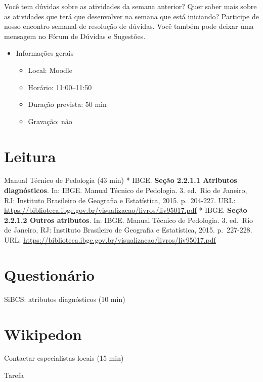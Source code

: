 \documentclass[
  11pt,
  a4paper,
  dvipsnames]{tufte-book}
\providecommand{\tightlist}{%
  \setlength{\itemsep}{0pt}\setlength{\parskip}{0pt}}
\begin{document}
Você tem dúvidas sobre as atividades da semana anterior? Quer saber mais sobre as atividades que terá que desenvolver na semana que está iniciando? Participe de nosso encontro semanal de resolução de dúvidas. Você também pode deixar uma mensagem no Fórum de Dúvidas e Sugestões.

\begin{itemize}
\tightlist
\item
  Informações gerais

  \begin{itemize}
  \tightlist
  \item
    Local: Moodle
  \item
    Horário: 11:00--11:50
  \item
    Duração prevista: 50 min
  \item
    Gravação: não
  \end{itemize}
\end{itemize}

\hypertarget{leitura-3}{%
\section{Leitura}\label{leitura-3}}

Manual Técnico de Pedologia (43 min)
* IBGE. \textbf{Seção 2.2.1.1 Atributos diagnósticos}. In: IBGE. Manual Técnico de Pedologia. 3. ed.~Rio de Janeiro, RJ: Instituto Brasileiro de Geografia e Estatística, 2015. p.~204-227. URL: \url{https://biblioteca.ibge.gov.br/visualizacao/livros/liv95017.pdf}
* IBGE. \textbf{Seção 2.2.1.2 Outros atributos}. In: IBGE. Manual Técnico de Pedologia. 3. ed.~Rio de Janeiro, RJ: Instituto Brasileiro de Geografia e Estatística, 2015. p.~227-228. URL: \url{https://biblioteca.ibge.gov.br/visualizacao/livros/liv95017.pdf}

\hypertarget{questionuxe1rio-4}{%
\section{Questionário}\label{questionuxe1rio-4}}

SiBCS: atributos diagnósticos (10 min)

\hypertarget{wikipedon-3}{%
\section{Wikipedon}\label{wikipedon-3}}

Contactar especialistas locais (15 min)

Tarefa
\end{document}

